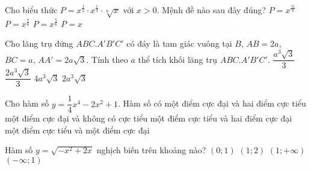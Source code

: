 \begin{ex}%
Cho biểu thức $P=x^{\frac{1}{2}}\cdot x^{\frac{1}{3}}\cdot\sqrt[6]{x}$ với $x>0$. Mệnh đề nào sau đây đúng?
\choice
{$P=x^{\frac{11}{6}}$}
{$P=x^{\frac{7}{6}}$}
{$P=x^{\frac{5}{6}}$}
{\True $P=x$}
\end{ex}

\begin{ex}%
Cho lăng trụ đứng $ABC.A'B'C'$ có đáy là tam giác vuông tại $B$, $AB=2a$, $BC=a$, $AA'=2a\sqrt3$. Tính theo $a$ thể tích khối lăng trụ $ABC.A'B'C'$.
\choice
{$\dfrac{a^3\sqrt3}{3}$}
{$\dfrac{2a^3\sqrt3}{3}$}
{$4a^3\sqrt3$}
{\True $2a^3\sqrt3$}
\end{ex}

\begin{ex}%
Cho hàm số $y=\dfrac{1}{4}x^4-2x^2+1$. Hàm số có
\choice
{\True một điểm cực đại và hai điểm cực tiểu}
{một điểm cực đại và không có cực tiểu}
{một điểm cực tiểu và hai điểm cực đại}
{một điểm cực tiểu và một điểm cực đại}
\end{ex}

\begin{ex}%
Hàm số $y=\sqrt{-x^2+2x}$ nghịch biến trên khoảng nào?
\choice
{$(0;1)$}
{\True $(1;2)$}
{$(1;+\infty)$}
{$(-\infty;1)$}
\end{ex}

